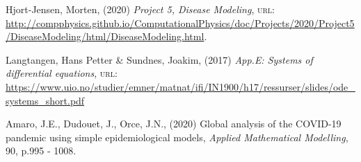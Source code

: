 \documentclass[a4paper,10pt,twocolumn]{article}
\begin{document}
\onecolumn
\begin{thebibliography}{9}

   

Hjort-Jensen, Morten, (2020) \textit{Project 5, Disease Modeling}, \textsc{url: }\url{http://compphysics.github.io/ComputationalPhysics/doc/Projects/2020/Project5/DiseaseModeling/html/DiseaseModeling.html}. 

Langtangen, Hans Petter \& Sundnes, Joakim, (2017) \textit{App.E: Systems of differential equations}, \textsc{url: }\url{https://www.uio.no/studier/emner/matnat/ifi/IN1900/h17/ressurser/slides/ode_systems_short.pdf}



Amaro, J.E., Dudouet, J., Orce, J.N., (2020) Global analysis of the COVID-19 pandemic using simple epidemiological models, \textit{Applied Mathematical Modelling}, 90, p.995 - 1008.

\end{thebibliography}



\end{document}
